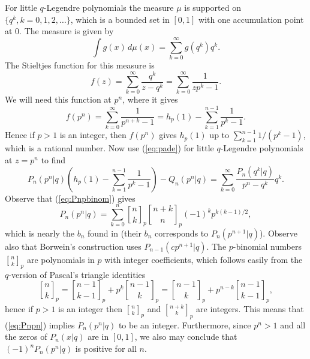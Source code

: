 \documentclass[12pt]{article}
\DeclareRobustCommand{\qbinom}{\genfrac[]{0pt}{}}
\begin{document}
For little $q$-Legendre polynomials the measure $\mu$ is supported on
$\{q^k, k=0,1,2,\ldots\}$, which is a bounded set in $[0,1]$ with one accumulation
point at $0$. The measure is given by
\[  \int g(x) \, d\mu(x) = \sum_{k=0}^\infty g(q^k) q^k. \]
The Stieltjes function for this measure is
\begin{equation}  \label{eq:markov2}
  f(z) = \sum_{k=0}^\infty \frac{q^k}{z-q^k} = \sum_{k=0}^\infty \frac{1}{zp^k-1}. 
\end{equation}
We will need this function at $p^n$, where it gives
\begin{equation}  \label{eq:markovpn}
   f(p^n) = \sum_{k=0}^\infty \frac{1}{p^{n+k}-1} = 
   h_p(1) - \sum_{k=1}^{n-1} \frac{1}{p^k-1}.
\end{equation}     
Hence if $p>1$ is an integer, then $f(p^n)$ gives $h_p(1)$ up to 
$\sum_{k=1}^{n-1} 1/(p^k-1)$, which is a rational number. Now use (\ref{eq:pade}) for
little $q$-Legendre polynomials at $z=p^n$ to find
\begin{equation}  \label{eq:padepn}
  P_n(p^n|q) \left( h_p(1) - \sum_{k=1}^{n-1} \frac{1}{p^k-1} \right)
   - Q_n(p^n|q) = \sum_{k=0}^\infty \frac{P_n(q^k|q)}{p^n-q^k} q^k.
\end{equation}
Observe that (\ref{eq:Pnpbinom}) gives
\begin{equation}  \label{eq:Pnpn}
  P_n(p^n|q) = \sum_{k=0}^n \qbinom{n}{k}_p \qbinom{n+k}{n}_p (-1)^k p^{k(k-1)/2},
\end{equation}
which is nearly the $b_n$ found in \cite[p.~277]{WZ} (their $b_n$ corresponds
to $P_n(p^{n+1}|q)$). Observe also that Borwein's  
construction \cite[Lemma 2]{bor2} uses $P_{n-1}(cp^{n+1}|q)$.
The $p$-binomial numbers $\qbinom{n}{k}_p$ are polynomials in $p$ with
integer coefficients, which follows easily from the $q$-version
of Pascal's triangle identities
\[  \qbinom{n}{k}_p = \qbinom{n-1}{k-1}_p + p^k \qbinom{n-1}{k}_p =
    \qbinom{n-1}{k}_p + p^{n-k} \qbinom{n-1}{k-1}_p, \]
hence if $p >1$ is an integer then $\qbinom{n}{k}_p$ and
$\qbinom{n+k}{k}_p$ are integers. This means that (\ref{eq:Pnpn}) implies 
$P_n(p^n|q)$ to be an integer. Furthermore, since $p^n > 1$ and all the
zeros of $P_n(x|q)$ are in $[0,1]$, we also may conclude
that $(-1)^n P_n(p^n|q)$ is positive for all $n$.
\end{document}
